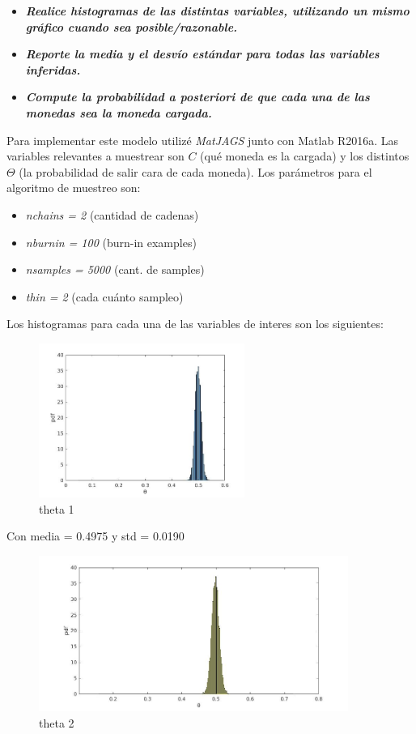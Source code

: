 \begin{itemize}
 \item \textbf{\textit{Realice histogramas de las distintas variables, utilizando un mismo gráfico cuando sea posible/razonable.}}
 \item \textbf{\textit{Reporte la media y el desvío estándar para todas las variables inferidas.}}
 \item \textbf{\textit{Compute la probabilidad a posteriori de que cada una de las monedas sea la moneda cargada.}}
\end{itemize}


Para implementar este modelo utilizé \textit{MatJAGS} junto con Matlab R2016a. Las variables relevantes a muestrear son $C$ (qué moneda es la cargada) y los distintos $\Theta$ (la probabilidad
de salir cara de cada moneda). Los parámetros para el algoritmo de muestreo son: 

\begin{itemize}
 \item \textit{nchains = 2} (cantidad de cadenas)
 \item \textit{nburnin = 100} (burn-in examples)
 \item \textit{nsamples = 5000} (cant. de samples)
 \item \textit{thin = 2} (cada cuánto sampleo)
\end{itemize}

Los histogramas para cada una de las variables de interes son los siguientes:


\begin{figure}[h!]
  \centering
    \includegraphics[width=0.6\textwidth]{imagenes/theta1.jpg}
  \caption{theta 1}
\end{figure}

Con media = 0.4975 y std = 0.0190

\newpage 

\begin{figure}[h]
    \includegraphics[width=0.9\textwidth]{imagenes/theta2.jpg}
  \caption{theta 2}
\end{figure}

